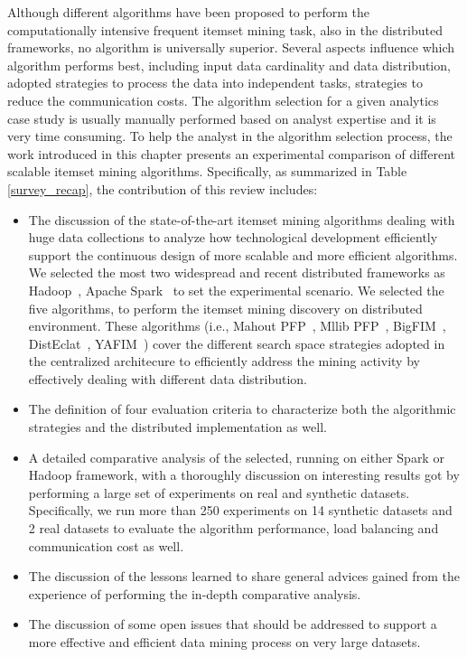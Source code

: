 Although different algorithms have been proposed to perform the computationally
intensive frequent itemset mining task, also in the distributed frameworks, no
algorithm is universally superior. Several aspects influence which algorithm
performs best, including input data cardinality and data distribution, adopted
strategies to process the data into independent tasks, strategies to reduce the
communication costs. The algorithm selection for a given analytics case study is
usually manually performed based on analyst expertise and it is very time
consuming. To help the analyst in the algorithm selection process, the work introduced in this chapter presents 
an experimental comparison of different scalable itemset mining
algorithms. Specifically, as summarized in Table \ref{survey_recap}, the
contribution of this review includes:
\begin{itemize}
\item The discussion of the state-of-the-art itemset mining algorithms dealing
with huge data collections to analyze how technological development efficiently
support the continuous design of more scalable and more efficient algorithms. We
selected the most two widespread and recent distributed frameworks as
Hadoop~\cite{HDFS}, Apache Spark~\cite{Zaharia_spark} to set the experimental
scenario. We selected the five algorithms, to
perform the itemset mining discovery on distributed environment. 	These
algorithms (i.e., Mahout PFP~\cite{Mahout}, Mllib PFP~\cite{MLLib},
BigFIM~\cite{bigfim}, DistEclat~\cite{bigfim}, YAFIM~\cite{YAFIM}) cover the
different search space strategies adopted in the centralized architecure to
efficiently address the mining activity by effectively dealing with different
data distribution.
\item
The definition of four evaluation criteria to characterize both  the algorithmic
strategies and the distributed implementation as well.
\item
A detailed comparative analysis of the selected, running on either Spark or
Hadoop framework, with a thoroughly discussion on interesting results got by
performing a large set of experiments on real and synthetic datasets.
Specifically, we run more than 250 experiments on 14 synthetic datasets and 2 real datasets to
evaluate the algorithm performance, load balancing and communication cost as
well.
\item
The discussion of the lessons learned to share general advices gained from the
experience of performing the in-depth comparative analysis.
\item
The discussion of some open issues that should be addressed to support a more
effective and efficient data mining process on very large datasets.
\end{itemize}

